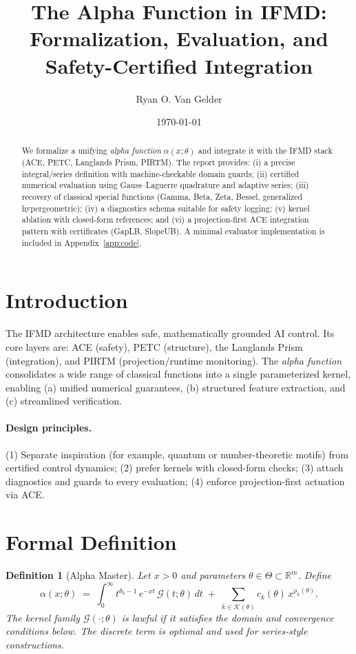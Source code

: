 \documentclass[11pt]{article}
\title{The Alpha Function in IFMD: Formalization, Evaluation, and\\ Safety-Certified Integration}
\author{Ryan O. Van Gelder}
\date{\today}
\newtheorem{definition}{Definition}
\theoremstyle{remark}
\newcommand{\R}{\mathbb{R}}
\begin{document}
\maketitle

\vspace{0.5em}

\begin{abstract}
We formalize a unifying \emph{alpha function} \(\alpha(x;\theta)\) and integrate it with the IFMD stack (ACE, PETC, Langlands Prism, PIRTM). The report provides: (i) a precise integral/series definition with machine-checkable domain guards; (ii) certified numerical evaluation using Gauss--Laguerre quadrature and adaptive series; (iii) recovery of classical special functions (Gamma, Beta, Zeta, Bessel, generalized hypergeometric); (iv) a diagnostics schema suitable for safety logging; (v) kernel ablation with closed-form references; and (vi) a projection-first ACE integration pattern with certificates (GapLB, SlopeUB). A minimal evaluator implementation is included in Appendix~\ref{app:code}.
\end{abstract}

\newpage
\tableofcontents

\section{Introduction}
\label{sec:intro}
The IFMD architecture enables safe, mathematically grounded AI control. Its core layers are: ACE (safety), PETC (structure), the Langlands Prism (integration), and PIRTM (projection/runtime monitoring). The \emph{alpha function} consolidates a wide range of classical functions into a single parameterized kernel, enabling (a) unified numerical guarantees, (b) structured feature extraction, and (c) streamlined verification.

\paragraph{Design principles.} (1) Separate inspiration (for example, quantum or number-theoretic motifs) from certified control dynamics; (2) prefer kernels with closed-form checks; (3) attach diagnostics and guards to every evaluation; (4) enforce projection-first actuation via ACE.

\section{Formal Definition}
\label{sec:formal}
\begin{definition}[Alpha Master]
Let \(x>0\) and parameters \(\theta\in\Theta\subset\R^m\). Define
\begin{equation}
\label{eq:alpha-master}
\alpha(x;\theta)\;=\;\int_{0}^{\infty} t^{\theta_0-1}\,e^{-xt}\,\mathcal{G}(t;\theta)\,dt\; +\; \sum_{k\in\mathcal{K}(\theta)} c_k(\theta)\,x^{\rho_k(\theta)}.
\end{equation}
The kernel family \(\mathcal{G}(\cdot;\theta)\) is \emph{lawful} if it satisfies the domain and convergence conditions below. The discrete term is optional and used for series-style constructions.
\end{definition}
\end{document}
